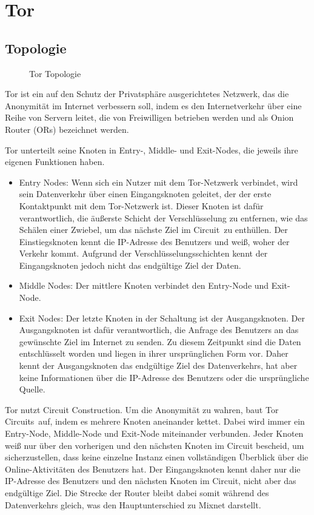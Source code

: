 \section{Tor}
\label{chap:tor}

\subsection{Topologie}
\label{chap:tor_topology}

\begin{figure}[h!]
    \centering
    
    \caption{Tor Topologie}
    \label{imgs:tor}
\end{figure}

Tor ist ein auf den Schutz der Privatsphäre ausgerichtetes Netzwerk, das die Anonymität im Internet verbessern soll, indem es den Internetverkehr über eine Reihe von Servern leitet, die von Freiwilligen betrieben werden und als Onion Router (ORs) bezeichnet werden.

Tor unterteilt seine Knoten in Entry-, Middle- und Exit-Nodes, die jeweils ihre eigenen Funktionen haben.

\begin{itemize}
    \item Entry Nodes: Wenn sich ein Nutzer mit dem Tor-Netzwerk verbindet, wird sein Datenverkehr über einen Eingangsknoten geleitet, der der erste Kontaktpunkt mit dem Tor-Netzwerk ist. Dieser Knoten ist dafür verantwortlich, die äußerste Schicht der Verschlüsselung zu entfernen, wie das Schälen einer Zwiebel, um das nächste Ziel im \glqq Circuit\grqq\ zu enthüllen. Der Einstiegsknoten kennt die IP-Adresse des Benutzers und weiß, woher der Verkehr kommt. Aufgrund der Verschlüsselungsschichten kennt der Eingangsknoten jedoch nicht das endgültige Ziel der Daten.
    \item Middle Nodes: Der mittlere Knoten verbindet den Entry-Node und Exit-Node.
    \item Exit Nodes: Der letzte Knoten in der Schaltung ist der Ausgangsknoten. Der Ausgangsknoten ist dafür verantwortlich, die Anfrage des Benutzers an das gewünschte Ziel im Internet zu senden. Zu diesem Zeitpunkt sind die Daten entschlüsselt worden und liegen in ihrer ursprünglichen Form vor. Daher kennt der Ausgangsknoten das endgültige Ziel des Datenverkehrs, hat aber keine Informationen über die IP-Adresse des Benutzers oder die ursprüngliche Quelle.
\end{itemize}

Tor nutzt Circuit Construction. Um die Anonymität zu wahren, baut Tor \glqq Circuits\grqq\ auf, indem es mehrere Knoten aneinander kettet. Dabei wird immer ein Entry-Node, Middle-Node und Exit-Node miteinander verbunden. Jeder Knoten weiß nur über den vorherigen und den nächsten Knoten im Circuit bescheid, um sicherzustellen, dass keine einzelne Instanz einen vollständigen Überblick über die Online-Aktivitäten des Benutzers hat. Der Eingangsknoten kennt daher nur die IP-Adresse des Benutzers und den nächsten Knoten im Circuit, nicht aber das endgültige Ziel. Die Strecke der Router bleibt dabei somit während des Datenverkehrs gleich, was den Hauptunterschied zu Mixnet darstellt.

